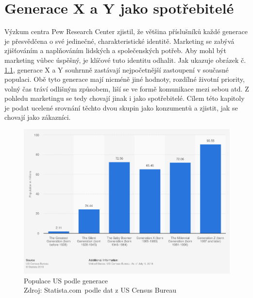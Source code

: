 \chapter{Generace X a Y jako spotřebitelé}

Výzkum centra Pew Research Center zjistil, že většina příslušníků každé generace je přesvědčena o své jedinečné, charakteristické identitě\cite[s. 22]{bergh2012coolznacky}.
Marketing se zabývá zjišťováním a naplňováním lidských a společenských potřeb.\cite[s. 43]{kotler2007marketingmanagement} Aby mohl být marketing vůbec úspěšný, je klíčové tuto identitu odhalit.
Jak ukazuje obrázek č. \ref{fig:us-population-by-generation}, generace X a Y souhrnně zastávají nejpočetnější zastoupení v současné populaci. Obě tyto generace mají nicméně jiné hodnoty, rozdílné životní priority, volný čas tráví odlišným způsobem, liší se ve formě komunikace mezi sebou atd. Z pohledu marketingu se tedy chovají jinak i jako spotřebitelé.
Cílem této kapitoly je podat ucelené srovnání těchto dvou skupin jako konzumentů a zjistit, jak se chovají jako zákazníci.

\medskip
\begin{figure}[htbp!]
    \centering
    \includegraphics[width=.88\textwidth]{assets/us-population-by-generation.png}
    \caption[Populace US podle generace]{Populace US podle generace \\ Zdroj: Statista.com\protect\footnotemark~podle dat z US Census Bureau }
    \label{fig:us-population-by-generation}
\end{figure}


